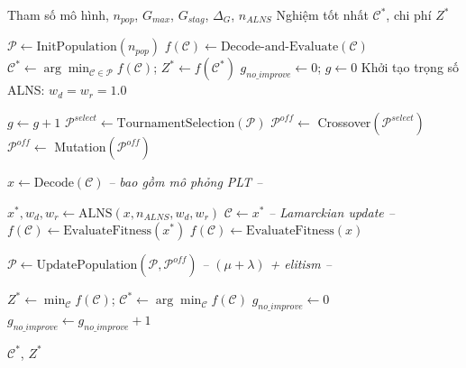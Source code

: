 \documentclass[12pt]{article}
\begin{document}
\begin{algorithm}[H]
\caption{Hybrid GA--ALNS}
\label{alg:hybrid}
\begin{algorithmic}[1]
\Require Tham số mô hình, $n_{pop}$, $G_{max}$, $G_{stag}$, $\Delta_G$, $n_{ALNS}$
\Ensure Nghiệm tốt nhất $\mathcal{C}^*$, chi phí $Z^*$

\State $\mathcal{P} \gets \text{InitPopulation}(n_{pop})$ 
  \State $f(\mathcal{C}) \gets \text{Decode-and-Evaluate}(\mathcal{C})$ 
\EndFor
\State $\mathcal{C}^* \gets \arg\min_{\mathcal{C} \in \mathcal{P}} f(\mathcal{C})$; \; $Z^* \gets f(\mathcal{C}^*)$
\State $g_{no\_improve} \gets 0$; \; $g \gets 0$
\State Khởi tạo trọng số ALNS: $w_d = w_r = 1.0$

  \State $g \gets g + 1$
  \State $\mathcal{P}^{select} \gets \text{TournamentSelection}(\mathcal{P})$ 
  \State $\mathcal{P}^{off} \gets $ Crossover$(\mathcal{P}^{select})$ 
  \State $\mathcal{P}^{off} \gets $ Mutation$(\mathcal{P}^{off})$ 

    \State $x \gets \text{Decode}(\mathcal{C})$ \quad \textit{-- bao gồm mô phỏng PLT --}
    
      \State $x^*, w_d, w_r \gets \text{ALNS}(x, n_{ALNS}, w_d, w_r)$ 
      \State $\mathcal{C} \gets x^*$ \quad \textit{-- Lamarckian update --}
      \State $f(\mathcal{C}) \gets \text{EvaluateFitness}(x^*)$
    \Else
      \State $f(\mathcal{C}) \gets \text{EvaluateFitness}(x)$
    \EndIf
  \EndFor

  \State $\mathcal{P} \gets \text{UpdatePopulation}(\mathcal{P}, \mathcal{P}^{off})$ \quad \textit{-- $(\mu+\lambda)$ + elitism --}

    \State $Z^* \gets \min_{\mathcal{C}} f(\mathcal{C})$; \; $\mathcal{C}^* \gets \arg\min_{\mathcal{C}} f(\mathcal{C})$
    \State $g_{no\_improve} \gets 0$
  \Else
    \State $g_{no\_improve} \gets g_{no\_improve} + 1$
  \EndIf
\EndWhile

\State \Return $\mathcal{C}^*$, $Z^*$

\end{algorithmic}
\end{algorithm}
\end{document}
